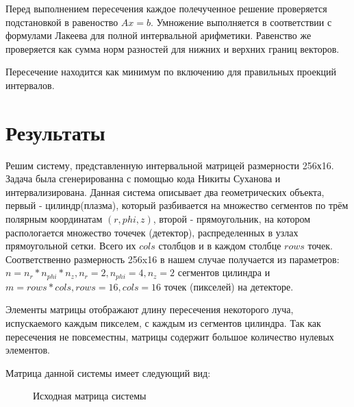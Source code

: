 \documentclass{article}
\begin{document}
Перед выполнением пересечения каждое полечученное решение проверяется подстановкой в равеноство $Ax = b$. 
Умножение выполняется в соответствии с формулами Лакеева для полной интервальной арифметики. Равенство же проверяется как сумма норм разностей для нижних и верхних границ векторов.

Пересечение находится как минимум по включению для правильных проекций интервалов.

\newpage

\section{Результаты}

Решим систему, представленную интервальной матрицей размерности 256х16. Задача была сгенерированна с помощью кода Никиты Суханова и интервализирована. Данная система описывает два геометрических объекта, первый - цилиндр(плазма), который разбивается на множество сегментов по трём полярным координатам $(r, phi, z)$, второй - прямоугольник, на котором распологается множество точечек (детектор), распределенных в узлах прямоугольной сетки. Всего их $cols$ столбцов и в каждом столбце $rows$ точек. Соответственно размерность 256x16 в нашем случае получается из параметров: $n = n_r * n_{phi} * n_z, n_r = 2, n_{phi} = 4, n_z = 2$ сегментов цилиндра и $m = rows * cols, rows = 16, cols = 16$ точек (пикселей) на детекторе.

Элементы матрицы отображают длину пересечения некоторого луча, испускаемого каждым пикселем, с каждым из сегментов цилиндра. Так как пересечения не повсеместны, матрицы содержит большое количество нулевых элементов.
 
Матрица данной системы имеет следующий вид:

\begin{figure}[h]
\caption{Исходная матрица системы}
\label{fig:image}
\end{figure}
\end{document}
